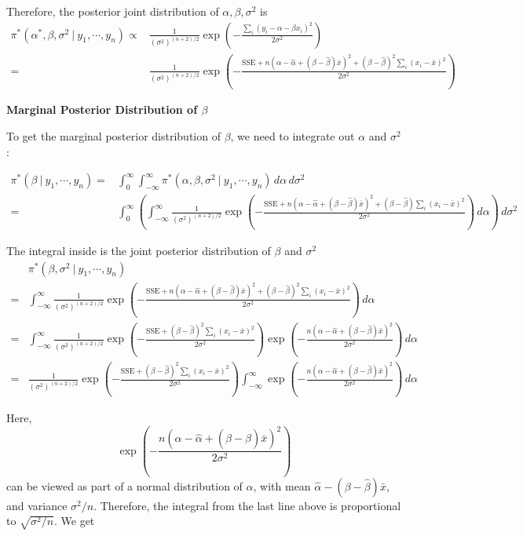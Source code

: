 \documentclass[]{book}
\theoremstyle{definition}
\theoremstyle{definition}
\theoremstyle{definition}
\theoremstyle{remark}
\begin{document}
Therefore, the posterior joint distribution of
\(\alpha, \beta, \sigma^2\) is \[ 
\begin{aligned}
\pi^*(\alpha^*, \beta,\sigma^2 ~|~y_1,\cdots, y_n) \propto & \frac{1}{(\sigma^2)^{(n+2)/2}}\exp\left(-\frac{\sum_i(y_i - \alpha - \beta x_i)^2}{2\sigma^2}\right) \\
= & \frac{1}{(\sigma^2)^{(n+2)/2}}\exp\left(-\frac{\text{SSE} + n(\alpha-\hat{\alpha}+(\beta-\hat{\beta})\bar{x})^2 + (\beta - \hat{\beta})^2\sum_i (x_i-\bar{x})^2}{2\sigma^2}\right)
\end{aligned}
\]

\textbf{Marginal Posterior Distribution of \(\beta\)}

To get the marginal posterior distribution of \(\beta\), we need to
integrate out \(\alpha\) and \(\sigma^2\):

\[
\begin{aligned}
\pi^*(\beta ~|~y_1,\cdots,y_n) = & \int_0^\infty \int_{-\infty}^\infty \pi^*(\alpha, \beta, \sigma^2~|~y_1,\cdots, y_n)\, d\alpha\, d\sigma^2 \\
= & \int_0^\infty \left(\int_{-\infty}^\infty \frac{1}{(\sigma^2)^{(n+2)/2}}\exp\left(-\frac{\text{SSE} + n(\alpha-\hat{\alpha}+(\beta-\hat{\beta})\bar{x})^2+(\beta-\hat{\beta})\sum_i(x_i-\bar{x})^2}{2\sigma^2}\right)\, d\alpha\right)\, d\sigma^2
\end{aligned}
\]

The integral inside is the joint posterior distribution of \(\beta\) and
\(\sigma^2\) \[
\begin{aligned}
& \pi^*(\beta, \sigma^2~|~y_1,\cdots,y_n) \\
= & \int_{-\infty}^\infty \frac{1}{(\sigma^2)^{(n+2)/2}}\exp\left(-\frac{\text{SSE}+n(\alpha-\hat{\alpha}+(\beta-\hat{\beta})\bar{x})^2+(\beta-\hat{\beta})^2\sum_i(x_i-\bar{x})^2}{2\sigma^2}\right)\, d\alpha\\
= & \int_{-\infty}^\infty \frac{1}{(\sigma^2)^{(n+2)/2}}\exp\left(-\frac{\text{SSE}+(\beta-\hat{\beta})^2\sum_i(x_i-\bar{x})^2}{2\sigma^2}\right) \exp\left(-\frac{n(\alpha-\hat{\alpha}+(\beta-\hat{\beta})\bar{x})^2}{2\sigma^2}\right)\, d\alpha \\
= & \frac{1}{(\sigma^2)^{(n+2)/2}}\exp\left(-\frac{\text{SSE}+(\beta-\hat{\beta})^2\sum_i(x_i-\bar{x})^2}{2\sigma^2}\right) \int_{-\infty}^\infty \exp\left(-\frac{n(\alpha-\hat{\alpha}+(\beta-\hat{\beta})\bar{x})^2}{2\sigma^2}\right)\, d\alpha
\end{aligned}
\]

Here,
\[ \exp\left(-\frac{n(\alpha-\hat{\alpha}+(\beta - \hat{\beta})\bar{x})^2}{2\sigma^2}\right) \]
can be viewed as part of a normal distribution of \(\alpha\), with mean
\(\hat{\alpha}-(\beta-\hat{\beta})\bar{x}\), and variance
\(\sigma^2/n\). Therefore, the integral from the last line above is
proportional to \(\sqrt{\sigma^2/n}\). We get
\end{document}
